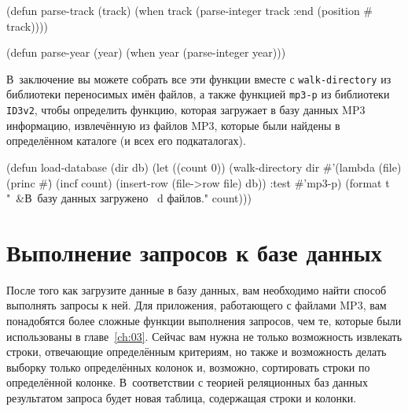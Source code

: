 \begin{myverb}
(defun parse-track (track)
  (when track (parse-integer track :end (position #\/ track))))

(defun parse-year (year)
  (when year (parse-integer year)))
\end{myverb}

В~заключение вы можете собрать все эти функции вместе с \lstinline{walk-directory} из
библиотеки переносимых имён файлов, а также функцией \lstinline{mp3-p} из библиотеки
\lstinline{ID3v2}, чтобы определить функцию, которая загружает в базу данных MP3 информацию,
извлечённую из файлов MP3, которые были найдены в определённом каталоге (и всех его
подкаталогах).

\begin{myverb}
(defun load-database (dir db)
  (let ((count 0))
    (walk-directory 
     dir 
     #'(lambda (file)
         (princ #\.)
         (incf count)
         (insert-row (file->row file) db))
     :test #'mp3-p)
    (format t "~&В~базу данных загружено ~d файлов." count)))
\end{myverb}

\section{Выполнение запросов к базе данных}

После того как загрузите данные в базу данных, вам необходимо найти способ выполнять
запросы к ней.  Для приложения, работающего с файлами MP3, вам понадобятся более сложные
функции выполнения запросов, чем те, которые были использованы в главе~\ref{ch:03}.  Сейчас
вам нужна не только возможность извлекать строки, отвечающие определённым критериям, но
также и возможность делать выборку только определённых колонок и, возможно, сортировать
строки по определённой колонке.  В~соответствии с теорией реляционных баз данных
результатом запроса будет новая таблица, содержащая строки и колонки.

